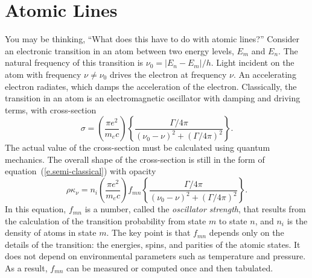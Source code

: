 \section{Atomic Lines}
You may be thinking, ``What does this have to do with atomic lines?'' Consider an electronic transition in an atom between two energy levels, $E_m$ and $E_n$. The natural frequency of this transition is $\nu_0 = |E_n-E_m|/h$. Light incident on the atom with frequency $\nu\neq\nu_0$ drives the electron at frequency $\nu$. An accelerating electron radiates, which damps the acceleration of the electron.  Classically, the transition in an atom is an electromagnetic oscillator with damping and driving terms, with cross-section
\begin{equation}\label{e.semi-classical}
    \sigma = \left(\frac{\pi e^2}{m_e c}\right)
    \left\{\frac{\Gamma/4\pi}{(\nu_0-\nu)^2 + (\Gamma/4\pi)^2}\right\}.
\end{equation}
The actual value of the cross-section must be calculated using quantum mechanics. The overall shape of the cross-section is still in the form of equation~(\ref{e.semi-classical}) with opacity
\begin{equation}
    \rho\kappa_\nu = n_i \left(\frac{\pi e^2}{m_e c}\right) f_{mn}
        \left\{\frac{\Gamma/4\pi}{(\nu_0-\nu)^2 + (\Gamma/4\pi)^2}\right\}.
\end{equation}
In this equation, $f_{mn}$ is a number, called the \emph{oscillator strength}, that results from the calculation of the transition probability from state $m$ to state $n$, and $n_i$ is the density of atoms in state $m$.  The key point is that $f_{mn}$ depends only on the details of the transition: the energies, spins, and parities of the atomic states.  It does not depend on environmental parameters such as temperature and pressure.  As a result, $f_{mn}$ can be measured or computed once and then tabulated.


